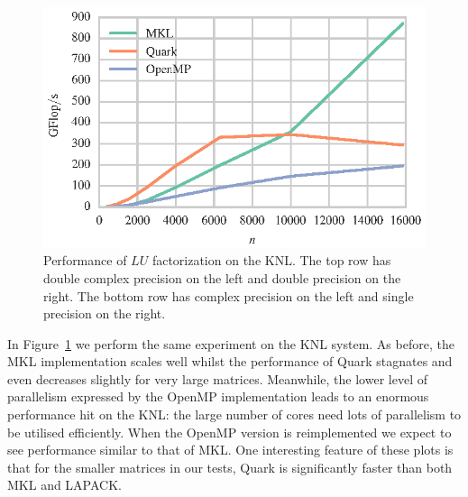 \documentclass[a4paper,12pt]{article}
\begin{document}
\begin{figure}[t]
  \includegraphics[scale=.85]{fig/knl_ram_sgetrf_weak_scaling.eps}
  \caption{Performance of $LU$ factorization on the KNL.
    The top row has double complex precision on the left and double
    precision on the right.
    The bottom row has complex precision on the left and single
    precision on the right.}
  \label{fig.lu_knl_ram}
\end{figure}

In Figure~\ref{fig.lu_knl_ram} we perform the same experiment
on the KNL system.
As before,
the MKL implementation scales well whilst
the performance of Quark stagnates and even decreases
slightly for very large matrices.
Meanwhile,
the lower level of parallelism expressed by the OpenMP
implementation leads to an enormous performance hit on the KNL:
the large number of cores need lots of parallelism
to be utilised efficiently.
When the OpenMP version is reimplemented we expect to see
performance similar to that of MKL.
One interesting feature of these plots is that for
the smaller matrices in our tests,
Quark is significantly faster than both MKL and LAPACK.

\end{document}
